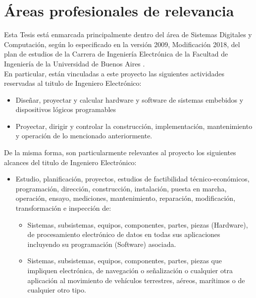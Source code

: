 \section{Áreas profesionales de relevancia}

Esta Tesis está enmarcada principalmente dentro del área de Sistemas Digitales y Computación, según lo especificado en la versión 2009, Modificación 2018, del plan de estudios de la Carrera de Ingeniería Electrónica de la Facultad de Ingeniería de la Universidad de Buenos Aires \cite{plan_fiuba}. \\

En particular, están vinculadas a este proyecto las siguientes actividades reservadas al tıitulo de Ingeniero Electrónico:
\begin{itemize}
    \item Diseñar, proyectar y calcular hardware y software de sistemas embebidos y dispositivos lógicos programables
    \item Proyectar, dirigir y controlar la construcción, implementación, mantenimiento y operación de lo mencionado anteriormente.
\end{itemize}


De la misma forma, son particularmente relevantes al proyecto los siguientes alcances del titulo de Ingeniero Electrónico: 

\begin{itemize}
    \item Estudio, planificación, proyectos, estudios de factibilidad técnico-económicos, programación, dirección, construcción, instalación, puesta en marcha, operación, ensayo, mediciones, mantenimiento, reparación, modificación, transformación e inspección de:
    \begin{itemize}
        \item Sistemas, subsistemas, equipos, componentes, partes, piezas (Hardware), de procesamiento electrónico de datos en todas sus aplicaciones incluyendo su programación (Software) asociada.
        \item Sistemas, subsistemas, equipos, componentes, partes, piezas que impliquen electrónica, de navegación o señalización o cualquier otra aplicación al movimiento de vehículos terrestres, aéreos, marítimos o de cualquier otro tipo.

    \end{itemize}
\end{itemize}
